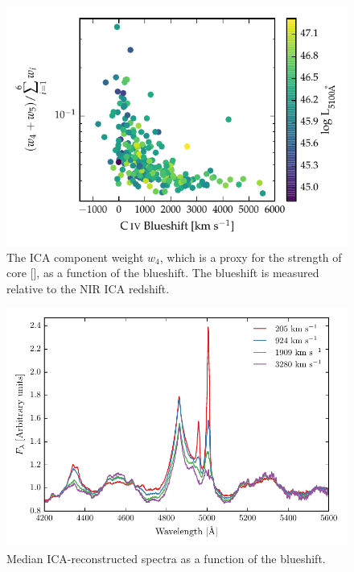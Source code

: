 \begin{figure}
    \centering
    \includegraphics[width=\textwidth]{figures/chapter04/civ_blueshift_oiii_strength.pdf} 
    \caption[{The \ac{ICA} component weight $w_4$, which is a proxy for the strength of core [], as a function of the  blueshift.}]{The \ac{ICA} component weight $w_4$, which is a proxy for the strength of core [], as a function of the  blueshift. The  blueshift is measured relative to the NIR \ac{ICA} redshift.}     
    \label{fig:civ_blueshift_oiii_strength}
\end{figure}

\begin{figure}
    \centering
    \includegraphics[width=\columnwidth]{figures/chapter04/mfica_composites.pdf} 
    \caption[{Median \ac{ICA}-reconstructed spectra as a function of the  blueshift.}]{Median \ac{ICA}-reconstructed spectra as a function of the  blueshift.}     
    \label{fig:mfica_composites}
\end{figure}

